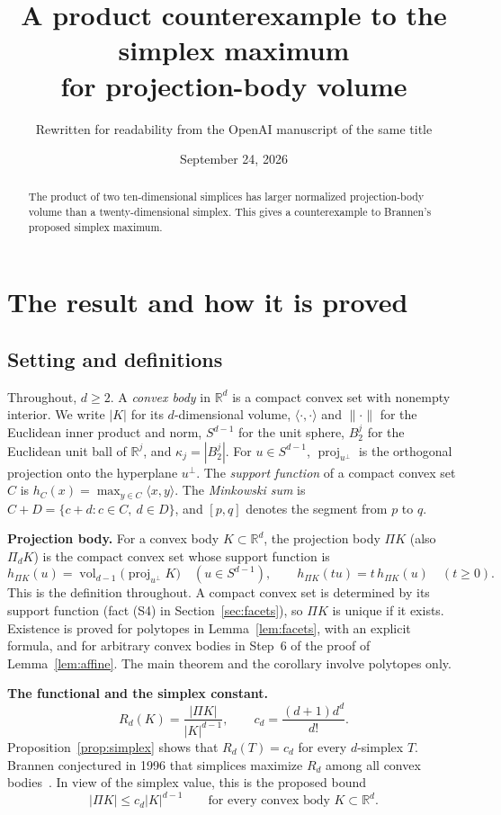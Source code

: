 \documentclass[11pt]{article}
\title{A product counterexample to the simplex maximum\\
for projection-body volume}
\author{Rewritten for readability from the OpenAI manuscript of the same title}
\date{September 24, 2026}
\newcommand{\R}{\mathbb R}
\DeclareMathOperator{\vol}{vol}
\DeclareMathOperator{\proj}{proj}
\begin{document}
\maketitle

\begin{abstract}
The product of two ten-dimensional simplices has larger normalized
projection-body volume than a twenty-dimensional simplex. This gives
a counterexample to Brannen's proposed simplex maximum.
\end{abstract}

\section{The result and how it is proved}

\subsection{Setting and definitions}

Throughout, \(d\ge2\). A \emph{convex body} in \(\R^d\) is a compact convex
set with nonempty interior. We write \(|K|\) for its \(d\)-dimensional
volume, \(\langle\cdot,\cdot\rangle\) and \(\|\cdot\|\) for the Euclidean
inner product and norm, \(S^{d-1}\) for the unit sphere, \(B_2^j\) for the
Euclidean unit ball of \(\R^j\), and \(\kappa_j=|B_2^j|\). For \(u\in S^{d-1}\),
\(\proj_{u^\perp}\) is the orthogonal projection onto the hyperplane
\(u^\perp\). The \emph{support function} of a compact convex set \(C\) is
\(h_C(x)=\max_{y\in C}\langle x,y\rangle\). The \emph{Minkowski sum} is
\(C+D=\{c+d:c\in C,\ d\in D\}\), and \([p,q]\) denotes the segment from \(p\)
to \(q\).

\smallskip\noindent\textbf{Projection body.}
For a convex body \(K\subset\R^d\), the projection body \(\Pi K\) (also
\(\Pi_dK\)) is the compact convex set whose support function is
\[
 h_{\Pi K}(u)=\vol_{d-1}\bigl(\proj_{u^\perp}K\bigr)\quad(u\in S^{d-1}),
 \qquad h_{\Pi K}(tu)=t\,h_{\Pi K}(u)\quad(t\ge0).
\]
This is the definition throughout. A compact convex set is determined by
its support function (fact (S4) in Section~\ref{sec:facets}), so \(\Pi K\)
is unique if it exists. Existence is proved for polytopes in
Lemma~\ref{lem:facets}, with an explicit formula, and for arbitrary convex
bodies in Step~6 of the proof of Lemma~\ref{lem:affine}. The main theorem
and the corollary involve polytopes only.

\smallskip\noindent\textbf{The functional and the simplex constant.}
\begin{equation}\label{eq:functional}
 R_d(K)=\frac{|\Pi K|}{|K|^{d-1}},
 \qquad c_d=\frac{(d+1)d^d}{d!}.
\end{equation}
Proposition~\ref{prop:simplex} shows that \(R_d(T)=c_d\) for every
\(d\)-simplex \(T\). Brannen conjectured in 1996 that simplices maximize
\(R_d\) among all convex bodies~\cite{Brannen}. In view of the simplex
value, this is the proposed bound
\begin{equation}\label{eq:proposed-bound}
 |\Pi K|\le c_d|K|^{d-1}\qquad\text{for every convex body }K\subset\R^d.
\end{equation}
\end{document}
